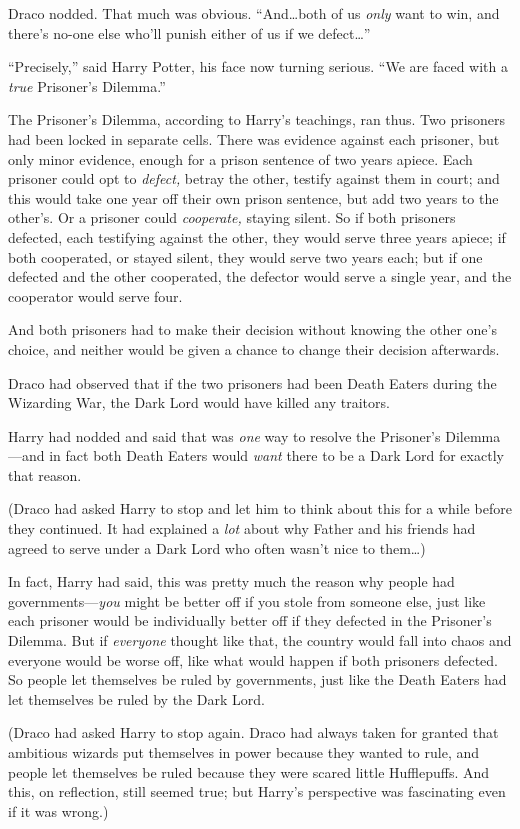 Draco nodded. That much was obvious. “And…both of us \emph{only} want to win, and there’s no-one else who’ll punish either of us if we defect…”

“Precisely,” said Harry Potter, his face now turning serious. “We are faced with a \emph{true} Prisoner’s Dilemma.”

The Prisoner’s Dilemma, according to Harry’s teachings, ran thus. Two prisoners had been locked in separate cells. There was evidence against each prisoner, but only minor evidence, enough for a prison sentence of two years apiece. Each prisoner could opt to \emph{defect,} betray the other, testify against them in court; and this would take one year off their own prison sentence, but add two years to the other’s. Or a prisoner could \emph{cooperate,} staying silent. So if both prisoners defected, each testifying against the other, they would serve three years apiece; if both cooperated, or stayed silent, they would serve two years each; but if one defected and the other cooperated, the defector would serve a single year, and the cooperator would serve four.

And both prisoners had to make their decision without knowing the other one’s choice, and neither would be given a chance to change their decision afterwards.

Draco had observed that if the two prisoners had been Death Eaters during the Wizarding War, the Dark Lord would have killed any traitors.

Harry had nodded and said that was \emph{one} way to resolve the Prisoner’s Dilemma—and in fact both Death Eaters would \emph{want} there to be a Dark Lord for exactly that reason.

(Draco had asked Harry to stop and let him to think about this for a while before they continued. It had explained a \emph{lot} about why Father and his friends had agreed to serve under a Dark Lord who often wasn’t nice to them…)

In fact, Harry had said, this was pretty much the reason why people had governments—\emph{you} might be better off if you stole from someone else, just like each prisoner would be individually better off if they defected in the Prisoner’s Dilemma. But if \emph{everyone} thought like that, the country would fall into chaos and everyone would be worse off, like what would happen if both prisoners defected. So people let themselves be ruled by governments, just like the Death Eaters had let themselves be ruled by the Dark Lord.

(Draco had asked Harry to stop again. Draco had always taken for granted that ambitious wizards put themselves in power because they wanted to rule, and people let themselves be ruled because they were scared little Hufflepuffs. And this, on reflection, still seemed true; but Harry’s perspective was fascinating even if it was wrong.)


